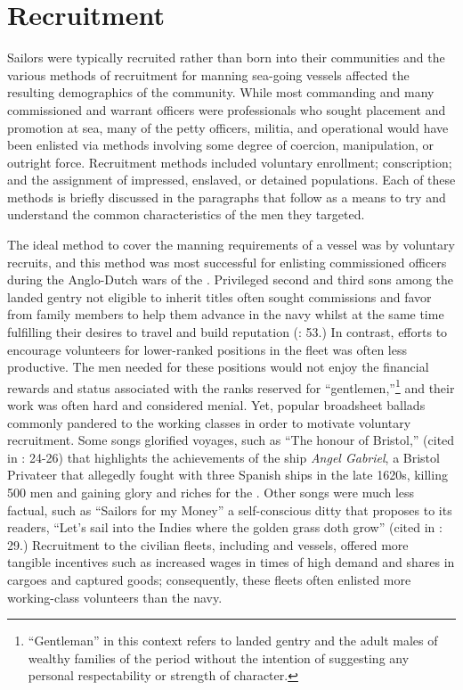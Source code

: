 \section{{Recruitment}}\label{sec:3.2}

  Sailors were typically recruited rather than born into their communities and the various methods of recruitment for manning sea-going vessels affected the resulting demographics of the community. While most commanding and many commissioned and warrant officers were professionals who sought placement and promotion at sea, many of the petty officers, militia, and operational  would have been enlisted via methods involving some degree of coercion, manipulation, or outright force. Recruitment methods included voluntary enrollment; conscription; and the assignment of impressed, enslaved, or detained populations. Each of these methods is briefly discussed in the paragraphs that follow as a means to try and understand the common characteristics of the men they targeted. 

  The ideal method to cover the manning requirements of a vessel was by voluntary recruits, and this method was most successful for enlisting commissioned officers during the Anglo-Dutch wars of the . Privileged second and third sons among the landed gentry not eligible to inherit titles often sought commissions and favor from family members to help them advance in the navy whilst at the same time fulfilling their desires to travel and build reputation (\citealt{Brown2011}: 53.) In contrast, efforts to encourage volunteers for lower-ranked positions in the fleet was often less productive. The men needed for these positions would not enjoy the financial rewards and status associated with the ranks reserved for “gentlemen,”\footnote{“Gentleman” in this context refers to landed gentry and the adult males of wealthy families of the period without the intention of suggesting any personal respectability or strength of character.}  and their work was often hard and considered menial. Yet, popular broadsheet ballads commonly pandered to the working classes in order to motivate voluntary recruitment. Some songs glorified voyages, such as “The honour of Bristol,” (cited in \citealt{Palmer1986}: 24-26) that highlights the achievements of the ship \textit{Angel Gabriel}, a Bristol Privateer that allegedly fought with three Spanish ships in the late 1620s, killing 500 men and gaining glory and riches for the . Other songs were much less factual, such as “Sailors for my Money” a self-conscious ditty that proposes to its readers, “Let’s sail into the Indies where the golden grass doth grow” (cited in \citealt{Palmer1986}: 29.) Recruitment to the civilian fleets, including  and  vessels, offered more tangible incentives such as increased wages in times of high demand and shares in cargoes and captured goods; consequently, these fleets often enlisted more working-class volunteers than the navy. 

